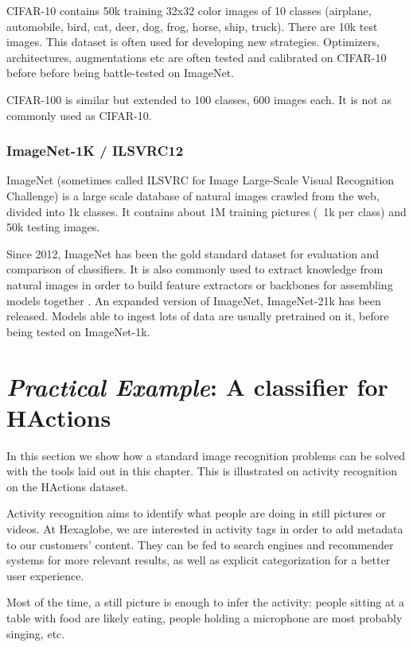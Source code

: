 CIFAR-10 \citep{cifar10} contains 50k training 32x32 color images of 10 classes (airplane, automobile, bird, cat, deer, dog, frog, horse, ship, truck). There are 10k test images. This dataset is often used for developing new strategies. Optimizers, architectures, augmentations etc are often tested and calibrated on CIFAR-10 before before being battle-tested on ImageNet.

CIFAR-100 is similar but extended to 100 classes, 600 images each. It is not as commonly used as CIFAR-10.

\subsubsection{ImageNet-1K / ILSVRC12}

ImageNet (sometimes called ILSVRC for Image Large-Scale Visual Recognition Challenge) \citep{ILSVRC15,imagenet} is a large scale database of natural images crawled from the web, divided into 1k classes. It contains about 1M training pictures (~1k per class) and 50k testing images.

Since 2012, ImageNet has been the gold standard dataset for evaluation and comparison of classifiers. It is also commonly used to extract knowledge from natural images in order to build feature extractors or backbones for assembling models together \citep{imagenettransfer}. An expanded version of ImageNet, ImageNet-21k has been released. Models able to ingest lots of data are usually pretrained on it, before being tested on ImageNet-1k.

\section{\emph{\arr Practical Example}: A classifier for HActions}
\label{actionclf}

In this section we show how a standard image recognition problems can be solved with the tools laid out in this chapter. This is illustrated on activity recognition on the HActions dataset.

Activity recognition aims to identify what people are doing in still pictures or videos. At Hexaglobe, we are interested in activity tags in order to add metadata to our customers' content. They can be fed to search engines and recommender systems for more relevant results, as well as explicit categorization for a better user experience.

Most of the time, a still picture is enough to infer the activity: people sitting at a table with food are likely eating, people holding a microphone are most probably singing, etc.

